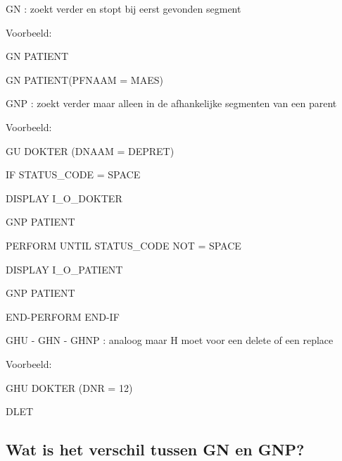 \noindent GN : zoekt verder en stopt bij eerst gevonden segment

Voorbeeld:

GN PATIENT

GN PATIENT(PFNAAM = MAES)


\noindent GNP : zoekt verder maar alleen in de afhankelijke segmenten van een parent

Voorbeeld:

GU DOKTER (DNAAM = DEPRET)

IF STATUS\_CODE = SPACE

           DISPLAY I\_O\_DOKTER
           
           GNP PATIENT
           
           PERFORM UNTIL STATUS\_CODE NOT = SPACE
           
                   DISPLAY I\_O\_PATIENT
                   
                   GNP PATIENT
                   
            END-PERFORM
END-IF

\noindent GHU - GHN - GHNP : analoog maar H moet voor een delete of een replace

Voorbeeld:

GHU DOKTER (DNR = 12)

DLET

\subsection{Wat is het verschil tussen GN en GNP?}